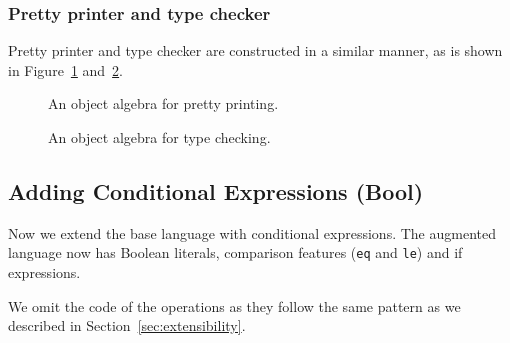 \subsubsection{Pretty printer and type checker}

Pretty printer and type checker are constructed in a similar manner, as is shown
in Figure~\ref{fig:printer} and~\ref{fig:checker}.

\begin{figure}[t]
  \centering
  \caption{An object algebra for pretty printing. }
  \label{fig:printer}
\end{figure}

\begin{figure}[t]
  \centering
  \caption{An object algebra for type checking. }
  \label{fig:checker}
\end{figure}


\subsection{Adding Conditional Expressions (Bool)}

Now we extend the base language with conditional expressions.
The augmented language now has Boolean literals, comparison features
(\lstinline{eq} and \lstinline{le}) and if expressions.

We omit the code of the operations as they follow the same pattern as we
described in Section~\ref{sec:extensibility}.





